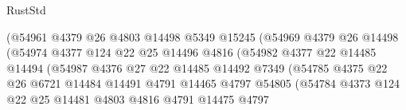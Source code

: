 \begin{lexlean}{RustStd}
\begin{coremodule}
                                    (@54961
                                      @4379
                                      @26
                                      @4803
                                      @14498
                                      @5349
                                      @15245
                                      (@54969
                                        @4379
                                        @26
                                        @14498
                                        (@54974
                                          @4377
                                          @124
                                          @22
                                          @25
                                          @14496
                                          @4816
                                          (@54982
                                            @4377
                                            @22
                                            @14485
                                            @14494
                                            (@54987
                                              @4376
                                              @27
                                              @22
                                              @14485
                                              @14492
                                              @7349
                                              (@54785
                                                @4375
                                                @22
                                                @26
                                                @6721
                                                @14484
                                                @14491
                                                @4791
                                                @14465
                                                @4797
                                                @54805
                                                (@54784
                                                  @4373
                                                  @124
                                                  @22
                                                  @25
                                                  @14481
                                                  @4803
                                                  @4816
                                                  @4791
                                                  @14475
                                                  @4797

\end{coremodule}
\end{lexlean}
